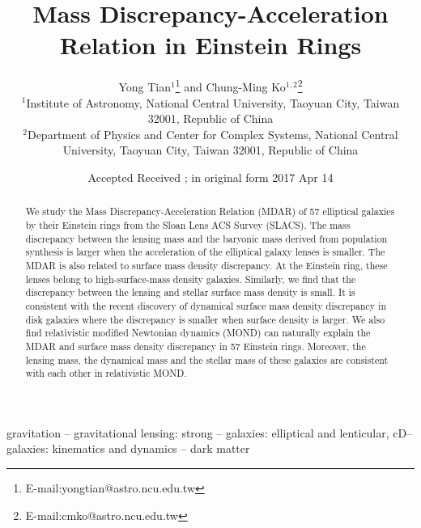\documentclass[fleqn,usenatbib,useAMS]{mnras}
\begin{document}
\title{\textbf{Mass Discrepancy-Acceleration Relation in Einstein Rings}}

\author[Tian \& Ko]
{Yong Tian$^{1}$\thanks{E-mail:yongtian@astro.ncu.edu.tw}
and Chung-Ming Ko$^{1,2}$\thanks{E-mail:cmko@astro.ncu.edu.tw}
\\
$^{1}$Institute of Astronomy, National Central University, Taoyuan City, Taiwan 32001, Republic of China \\
$^{2}$Department of Physics and Center for Complex Systems, National Central University, Taoyuan City, Taiwan 32001, Republic of China
}

\date{Accepted Received ; in original form 2017 Apr 14}

\maketitle

    \begin{abstract}
    We study the Mass Discrepancy-Acceleration Relation (MDAR) of 57 elliptical galaxies by their Einstein rings from the Sloan Lens ACS Survey (SLACS).
    The mass discrepancy between the lensing mass and the baryonic mass derived from population synthesis is larger when the acceleration of the elliptical galaxy lenses is smaller.
    The MDAR is also related to surface mass density discrepancy.
    At the Einstein ring, these lenses belong to high-surface-mass density galaxies.
    Similarly, we find that the discrepancy between the lensing and stellar surface mass density is small.
    It is consistent with the recent discovery of dynamical surface mass density discrepancy in disk galaxies where the discrepancy is smaller when surface density is larger.
    We also find relativistic modified Newtonian dynamics (MOND) can naturally explain the MDAR and surface mass density discrepancy in 57 Einstein rings.
    Moreover, the lensing mass, the dynamical mass and the stellar mass of these galaxies are consistent with each other in relativistic MOND.
    \end{abstract}

\begin{keywords}
gravitation -- gravitational lensing: strong -- galaxies: elliptical and lenticular, cD-- galaxies: kinematics and dynamics -- dark matter
\end{keywords}
\end{document}
